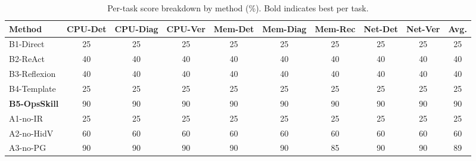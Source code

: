 \begin{table}[t]
\centering
\caption{Per-task score breakdown by method (\%). Bold indicates best per task.}
\label{tab:per-task}
\small
\setlength{\tabcolsep}{4pt}
\begin{tabular}{lccccccccc}
\toprule
\textbf{Method} & \textbf{CPU-Det} & \textbf{CPU-Diag} & \textbf{CPU-Ver} & \textbf{Mem-Det} & \textbf{Mem-Diag} & \textbf{Mem-Rec} & \textbf{Net-Det} & \textbf{Net-Ver} & \textbf{Avg.} \\
\midrule
B1-Direct & 25 & 25 & 25 & 25 & 25 & 25 & 25 & 25 & 25 \\
B2-ReAct & 40 & 40 & 40 & 40 & 40 & 40 & 40 & 40 & 40 \\
B3-Reflexion & 40 & 40 & 40 & 40 & 40 & 40 & 40 & 40 & 40 \\
B4-Template & 25 & 25 & 25 & 25 & 25 & 25 & 25 & 25 & 25 \\
\midrule
\textbf{B5-OpsSkill} & 90 & 90 & 90 & 90 & 90 & 90 & 90 & 90 & 90 \\
A1-no-IR & 25 & 25 & 25 & 25 & 25 & 25 & 25 & 25 & 25 \\
A2-no-HidV & 60 & 60 & 60 & 60 & 60 & 60 & 60 & 60 & 60 \\
A3-no-PG & 90 & 90 & 90 & 90 & 90 & 85 & 90 & 90 & 89 \\
\bottomrule
\end{tabular}
\end{table}